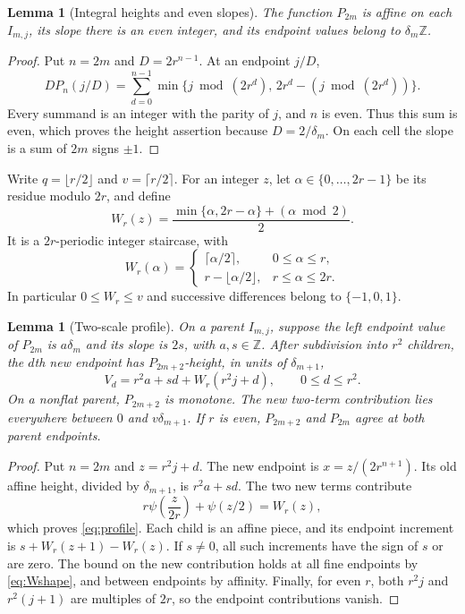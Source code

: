 \documentclass[11pt]{article}
\newtheorem{lemma}[theorem]{Lemma}
\theoremstyle{definition}
\theoremstyle{remark}
\newcommand{\Z}{\mathbb Z}
\begin{document}
\begin{lemma}[Integral heights and even slopes]\label{lem:grid}
The function $P_{2m}$ is affine on each $I_{m,j}$, its slope there is an
even integer, and its endpoint values belong to $\delta_m\Z$.
\end{lemma}
\begin{proof}
Put $n=2m$ and $D=2r^{n-1}$. At an endpoint $j/D$,
\begin{equation}\label{eq:endpointinteger}
 D P_n(j/D)=\sum_{d=0}^{n-1}
 \min\{j\bmod(2r^d),\,2r^d-(j\bmod(2r^d))\}.
\end{equation}
Every summand is an integer with the parity of $j$, and $n$ is even.
Thus this sum is even, which proves the height assertion because
$D=2/\delta_m$. On each cell the slope is a sum of $2m$ signs $\pm1$.
\end{proof}

Write $q=\lfloor r/2\rfloor$ and $v=\lceil r/2\rceil$.
For an integer $z$, let $\alpha\in\{0,\ldots,2r-1\}$ be its residue
modulo $2r$, and define
\begin{equation}\label{eq:Wdef}
 W_r(z)=\frac{\min\{\alpha,2r-\alpha\}+(\alpha\bmod2)}2.
\end{equation}
It is a $2r$-periodic integer staircase, with
\begin{equation}\label{eq:Wshape}
 W_r(\alpha)=\begin{cases}
 \lceil\alpha/2\rceil,&0\le\alpha\le r,\\
 r-\lfloor\alpha/2\rfloor,&r\le\alpha\le2r.
 \end{cases}
\end{equation}
In particular $0\le W_r\le v$ and successive differences belong to
$\{-1,0,1\}$.

\begin{lemma}[Two-scale profile]\label{lem:profile}
On a parent $I_{m,j}$, suppose the left endpoint value of $P_{2m}$ is
$a\delta_m$ and its slope is $2s$, with $a,s\in\Z$. After subdivision
into $r^2$ children, the $d$th new endpoint has $P_{2m+2}$-height, in units
of $\delta_{m+1}$,
\begin{equation}\label{eq:profile}
 V_d=r^2a+s d+W_r(r^2j+d),\qquad0\le d\le r^2.
\end{equation}
On a nonflat parent, $P_{2m+2}$ is monotone. The new two-term contribution
lies everywhere between $0$ and $v\delta_{m+1}$.
If $r$ is even, $P_{2m+2}$ and $P_{2m}$ agree at both parent endpoints.
\end{lemma}
\begin{proof}
Put $n=2m$ and $z=r^2j+d$. The new endpoint is
$x=z/(2r^{n+1})$. Its old affine height, divided by $\delta_{m+1}$, is
$r^2a+sd$. The two new terms contribute
\[
 r\psi\left(\frac{z}{2r}\right)+\psi(z/2)=W_r(z),
\]
which proves \cref{eq:profile}. Each child is an affine piece, and its
endpoint increment is $s+W_r(z+1)-W_r(z)$. If $s\ne0$, all such increments
have the sign of $s$ or are zero. The bound on the new contribution holds
at all fine endpoints by \cref{eq:Wshape}, and between endpoints by
affinity. Finally, for even $r$, both $r^2j$ and $r^2(j+1)$ are multiples
of $2r$, so the endpoint contributions vanish.
\end{proof}
\end{document}
